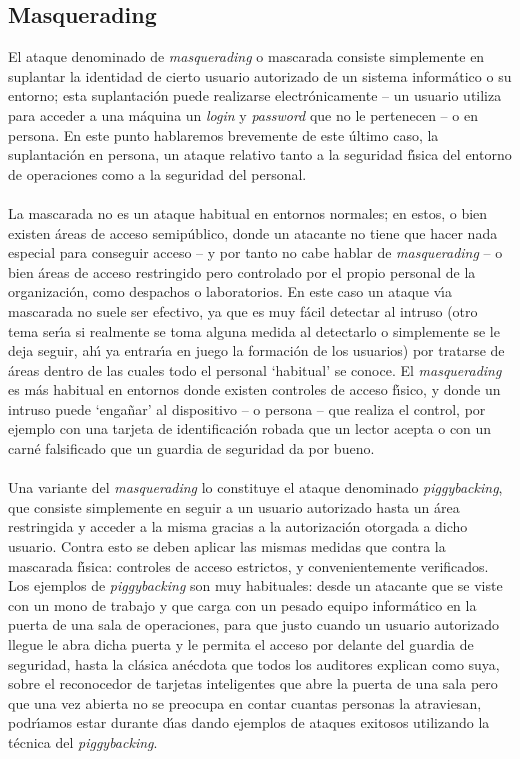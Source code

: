 \subsection{Masquerading}
El ataque denominado de {\it masquerading} o mascarada consiste simplemente en
suplantar la identidad de cierto usuario autorizado de un sistema inform\'atico
o su entorno; esta suplantaci\'on puede realizarse electr\'onicamente -- un 
usuario utiliza para acceder a una m\'aquina un {\it login} y {\it password} 
que no le pertenecen -- o en persona. En este punto hablaremos brevemente de
este \'ultimo caso, la suplantaci\'on en persona, un ataque relativo tanto a
la seguridad f\'{\i}sica del entorno de operaciones como a la seguridad del
personal.\\
\\La mascarada no es un ataque habitual en entornos normales; en estos, o bien
existen \'areas de acceso semip\'ublico, donde un atacante no tiene que hacer
nada especial para conseguir acceso -- y por tanto no cabe hablar de {\it
masquerading} -- o bien \'areas de acceso restringido pero controlado por el
propio personal de la organizaci\'on, como despachos o laboratorios. En este
caso un ataque v\'{\i}a mascarada no suele ser efectivo, ya que es muy f\'acil
detectar al intruso (otro tema ser\'{\i}a si realmente se toma alguna medida al
detectarlo o simplemente se le deja seguir, ah\'{\i} ya entrar\'{\i}a en
juego la formaci\'on de los usuarios) por tratarse de \'areas dentro de las 
cuales todo el personal `habitual' se conoce. El {\it masquerading} es m\'as
habitual en entornos donde existen controles de acceso f\'{\i}sico, y donde
un intruso puede `enga\~nar' al dispositivo -- o persona -- que realiza el 
control, por ejemplo con una tarjeta de identificaci\'on robada que un lector
acepta o con un carn\'e falsificado que un guardia de seguridad da por bueno.\\ 
\\Una variante del {\it masquerading} lo constituye el ataque denominado {\it
piggybacking}, que consiste simplemente en seguir a un usuario autorizado hasta
un \'area restringida y acceder a la misma gracias a la autorizaci\'on otorgada
a dicho usuario. Contra esto se deben aplicar las mismas medidas que contra
la mascarada f\'{\i}sica: controles de acceso estrictos, y convenientemente 
verificados. Los ejemplos de {\it piggybacking} son muy habituales: desde un
atacante que se viste con un mono de trabajo y que carga con un pesado equipo 
inform\'atico en la puerta de una sala de operaciones, para que justo cuando
un usuario autorizado llegue le abra dicha puerta y le permita el acceso por 
delante del guardia de seguridad, hasta la cl\'asica an\'ecdota que todos los
auditores explican como suya, sobre el reconocedor de tarjetas inteligentes que
abre la puerta de una sala pero que una vez abierta no se preocupa en contar
cuantas personas la atraviesan, podr\'{\i}amos estar durante d\'{\i}as dando
ejemplos de ataques exitosos utilizando la t\'ecnica del {\it piggybacking}.
